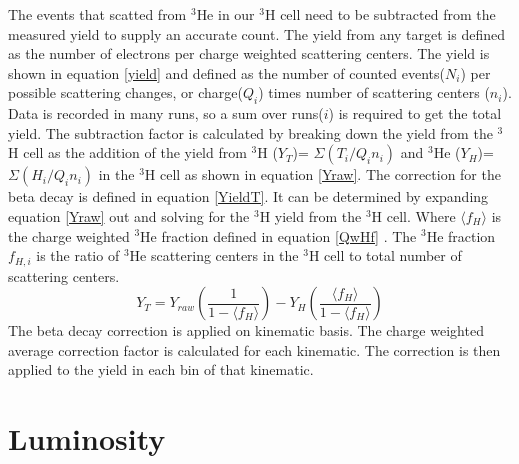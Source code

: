 The events that scatted from $^3$He in our $^3$H cell need to be subtracted from the measured yield to supply an accurate count. The yield from any target is defined as the number of electrons per charge weighted scattering centers. The yield is shown in equation \ref{yield} and defined as the number of counted events($N_i$) per possible scattering changes, or charge($Q_i$) times number of scattering centers ($n_i$). Data is recorded in many runs, so a sum over runs($i$) is required to get the total yield. The subtraction factor is calculated by breaking down the yield from the $^3$H cell as the addition of the yield from $^3$H ($Y_T$)= $\Sigma(T_i/Q_in_{i})$ and $^3$He ($Y_H$)= $\Sigma(H_i/Q_in_{i})$ in the $^3$H cell as shown in equation \ref{Yraw}. The correction for the beta decay is defined in equation \ref{YieldT}. It can be determined by expanding equation \ref{Yraw} out and solving for the $^3$H yield from the $^3$H cell. Where $\langle f_H \rangle$ is the charge weighted $^3$He fraction defined in equation \ref{QwHf} \cite{primer}. The $^3$He fraction $f_{H,i}$ is the ratio of $^3$He scattering centers in the $^3$H cell to total number of scattering centers. 
\begin{equation}
Y_T = Y_{raw}\left(\frac{1}{1-\langle f_H \rangle}\right) - Y_H \left(\frac{\langle f_H \rangle}{1-\langle f_H \rangle}\right) \label{YieldT}
\end{equation}
The beta decay correction is applied on kinematic basis. The charge weighted average correction factor is calculated for each kinematic. The correction is then applied to the yield in each bin of that kinematic. 


\section{Luminosity}
